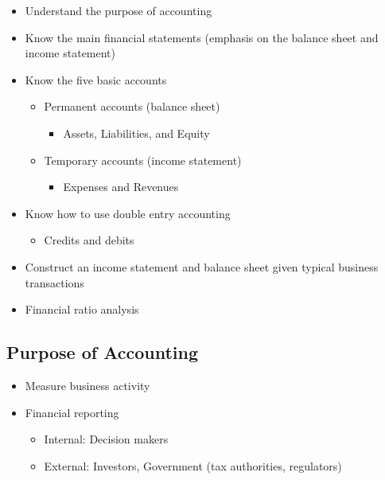 \begin{summary}
    \begin{itemize}
        \item Understand the purpose of accounting
        \item Know the main financial statements (emphasis on the balance sheet and income statement)
        \item Know the five basic accounts
        \begin{itemize}
            \item Permanent accounts (balance sheet)
            \begin{itemize}
                \item Assets, Liabilities, and Equity
            \end{itemize}
            \item Temporary accounts (income statement)
            \begin{itemize}
                \item Expenses and Revenues
            \end{itemize}
        \end{itemize}
        \item Know how to use double entry accounting
        \begin{itemize}
            \item Credits and debits
        \end{itemize}
        \item Construct an income statement and balance sheet given typical business transactions
        \item Financial ratio analysis
    \end{itemize}    
\end{summary}

\subsection{Purpose of Accounting}
\begin{definition}
    \begin{itemize}
        \item Measure business activity
        \item Financial reporting 
        \begin{itemize}
            \item Internal: Decision makers
            \item External: Investors, Government (tax authorities, regulators)
        \end{itemize}
    \end{itemize}
\end{definition}

